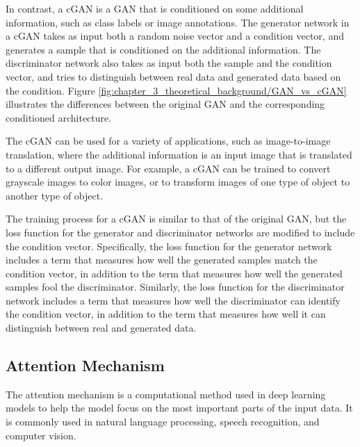 In contrast, a cGAN is a GAN that is conditioned on some additional information, such as class labels or image annotations. The generator network in a cGAN takes as input both a random noise vector and a condition vector, and generates a sample that is conditioned on the additional information. The discriminator network also takes as input both the sample and the condition vector, and tries to distinguish between real data and generated data based on the condition. Figure \ref{fig:chapter_3_theoretical_background/GAN_vs_cGAN} illustrates the differences between the original GAN and the corresponding conditioned architecture.

The cGAN can be used for a variety of applications, such as image-to-image translation, where the additional information is an input image that is translated to a different output image. For example, a cGAN can be trained to convert grayscale images to color images, or to transform images of one type of object to another type of object.

The training process for a cGAN is similar to that of the original GAN, but the loss function for the generator and discriminator networks are modified to include the condition vector. Specifically, the loss function for the generator network includes a term that measures how well the generated samples match the condition vector, in addition to the term that measures how well the generated samples fool the discriminator. Similarly, the loss function for the discriminator network includes a term that measures how well the discriminator can identify the condition vector, in addition to the term that measures how well it can distinguish between real and generated data.


\subsection{Attention Mechanism}
\label{subsec:3_attention}

The attention mechanism is a computational method used in deep learning models to help the model focus on the most important parts of the input data. It is commonly used in natural language processing, speech recognition, and computer vision.

